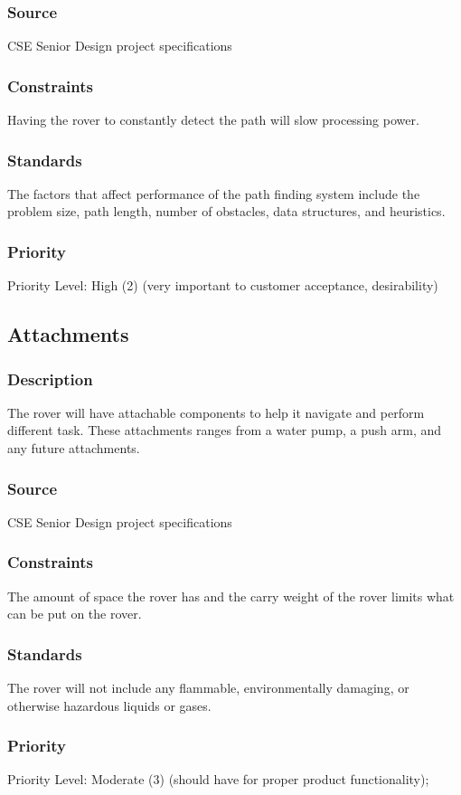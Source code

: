 \subsubsection{Source}
 CSE Senior Design project specifications
\subsubsection{Constraints}
Having the rover to constantly detect the path will slow processing power.
\subsubsection{Standards}
The factors that affect performance of the path finding system include the problem size, path length, number of obstacles, data structures, and heuristics.
\subsubsection{Priority}
Priority Level: High (2) (very important to customer acceptance, desirability)


\subsection{Attachments}
\subsubsection{Description}
The rover will have attachable components to help it navigate and perform different task. These attachments ranges from a water pump, a push arm, and any future attachments.
\subsubsection{Source}
 CSE Senior Design project specifications
\subsubsection{Constraints}
The amount of space the rover has and the carry weight of the rover limits what can be put on the rover.
\subsubsection{Standards}
The rover will not include any flammable, environmentally damaging, or otherwise hazardous liquids or gases.
\subsubsection{Priority}
Priority Level: Moderate (3) (should have for proper product functionality);
